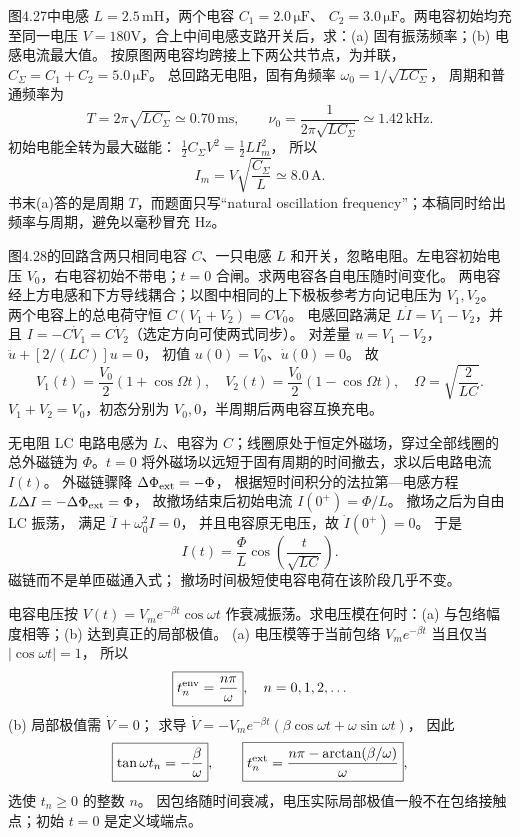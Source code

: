图4.27中电感 $L=2.5\,\mathrm{mH}$，两个电容 $C_1=2.0\,\mathrm{\mu F}$、
$C_2=3.0\,\mathrm{\mu F}$。两电容初始均充至同一电压 $V=180$V，合上中间电感支路开关后，求：(a) 固有振荡频率；(b) 电感电流最大值。
\exsolution
按原图两电容均跨接上下两公共节点，为并联，
$C_\Sigma=C_1+C_2=5.0\,\mathrm{\mu F}$。
总回路无电阻，固有角频率
$\omega_0=1/\sqrt{LC_\Sigma}$，
周期和普通频率为
\[
\boxed{T=2\pi\sqrt{LC_\Sigma}
\simeq0.70\,\mathrm{ms}},\qquad
\boxed{\nu_0=\frac1{2\pi\sqrt{LC_\Sigma}}
\simeq1.42\,\mathrm{kHz}}.
\]
初始电能全转为最大磁能：
$\tfrac12C_\Sigma V^2=\tfrac12LI_m^2$，
所以
\[
\boxed{I_m=V\sqrt{\frac{C_\Sigma}{L}}
\simeq8.0\,\mathrm A}.
\]
\excheck 书末(a)答的是周期 $T$，而题面只写“natural oscillation frequency”；本稿同时给出频率与周期，避免以毫秒冒充 Hz。

图4.28的回路含两只相同电容 $C$、一只电感 $L$ 和开关，忽略电阻。左电容初始电压 $V_0$，右电容初始不带电；$t=0$ 合闸。求两电容各自电压随时间变化。
\exsolution
两电容经上方电感和下方导线耦合；以图中相同的上下极板参考方向记电压为 $V_1,V_2$。
两个电容上的总电荷守恒
$C(V_1+V_2)=CV_0$。
电感回路满足
$L\dot I=V_1-V_2$，并且
$I=-C\dot V_1=C\dot V_2$（选定方向可使两式同步）。
对差量 $u=V_1-V_2$，
$\ddot u+[2/(LC)]u=0$，
初值 $u(0)=V_0$、$\dot u(0)=0$。
故
\[
\boxed{V_1(t)=\frac{V_0}{2}(1+\cos\Omega t)},\quad
\boxed{V_2(t)=\frac{V_0}{2}(1-\cos\Omega t)},\quad
\boxed{\Omega=\sqrt{\frac2{LC}}}.
\]
\excheck $V_1+V_2=V_0$，初态分别为 $V_0,0$，半周期后两电容互换充电。

无电阻 LC 电路电感为 $L$、电容为 $C$；线圈原处于恒定外磁场，穿过全部线圈的总外磁链为 $\Phi$。$t=0$ 将外磁场以远短于固有周期的时间撤去，求以后电路电流 $I(t)$。
\exsolution
外磁链骤降 $\Delta\Phi_{\rm ext}=-\Phi$，
根据短时间积分的法拉第—电感方程
$L\Delta I=-\Delta\Phi_{\rm ext}=\Phi$，
故撤场结束后初始电流
$I(0^+)=\Phi/L$。
撤场之后为自由 LC 振荡，
满足
$\ddot I+\omega_0^2I=0$，
并且电容原无电压，故
$\dot I(0^+)=0$。
于是
\[
\boxed{I(t)=\frac{\Phi}{L}
\cos\left(\frac{t}{\sqrt{LC}}\right)}.
\]
\excheck 磁链而不是单匝磁通入式；
撤场时间极短使电容电荷在该阶段几乎不变。

电容电压按
$V(t)=V_me^{-\beta t}\cos\omega t$
作衰减振荡。求电压模在何时：(a) 与包络幅度相等；(b) 达到真正的局部极值。
\exsolution
(a) 电压模等于当前包络
$V_me^{-\beta t}$ 当且仅当
$|\cos\omega t|=1$，
所以
\[
\boxed{t_n^{\rm env}=\frac{n\pi}{\omega}},
\quad n=0,1,2,\ldots
\]
(b) 局部极值需 $\dot V=0$；
求导
$\dot V=-V_me^{-\beta t}
(\beta\cos\omega t+\omega\sin\omega t)$，
因此
\[
\boxed{\tan\omega t_n=-\frac\beta\omega},
\qquad
\boxed{t_n^{\rm ext}=
\frac{n\pi-\arctan(\beta/\omega)}{\omega}},
\]
选使 $t_n\ge0$ 的整数 $n$。
\excheck 因包络随时间衰减，电压实际局部极值一般不在包络接触点；初始 $t=0$ 是定义域端点。

